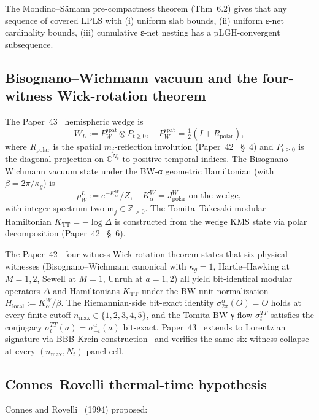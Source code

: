 \documentclass[11pt,a4paper]{article}
\theoremstyle{plain}
\theoremstyle{definition}
\newcommand{\nmax}{n_{\max}}
\newcommand{\Nt}{N_{t}}
\newcommand{\C}{\mathbb{C}}
\newcommand{\Z}{\mathbb{Z}}
\newcommand{\spat}{\mathrm{spat}}
\newcommand{\Kalpha}{K_{\alpha}^{W}}
\newcommand{\Hloc}{H_{\mathrm{local}}}
\newcommand{\kappag}{\kappa_{g}}
\begin{document}
The Mondino--S\"amann pre-compactness theorem (Thm~6.2) gives that
any sequence of covered LPLS with (i) uniform slab bounds, (ii) uniform
ε-net cardinality bounds, (iii) cumulative ε-net nesting has a
pLGH-convergent subsequence.

\subsection{Bisognano--Wichmann vacuum and the four-witness
Wick-rotation theorem}\label{sec:bw_four_witness_recap}

The Paper~43~\cite{paper43} hemispheric wedge is
\[
W_{L} := P_{W}^{\spat} \otimes P_{t \ge 0},
\quad
P_{W}^{\spat} = \tfrac{1}{2}(I + R_{\mathrm{polar}}),
\]
where $R_{\mathrm{polar}}$ is the spatial $m_{j}$-reflection involution
(Paper~42~\cite{paper42} \S~4) and $P_{t \ge 0}$ is the diagonal
projection on $\C^{\Nt}$ to positive temporal indices. The
Bisognano--Wichmann vacuum state under the BW-α geometric
Hamiltonian (with $\beta = 2\pi/\kappag$) is
\[
\rho_{W}^{L} := e^{-\Kalpha}/Z,
\quad
\Kalpha = J_{\mathrm{polar}}^{W} \text{ on the wedge},
\]
with integer spectrum $\mathrm{two\_m}_{j} \in \Z_{>0}$. The
Tomita--Takesaki modular Hamiltonian $K_{\mathrm{TT}} = -\log \Delta$
is constructed from the wedge KMS state via polar decomposition
(Paper~42~\cite{paper42} \S~6).

The Paper~42~\cite{paper42} four-witness Wick-rotation theorem states
that six physical witnesses (Bisognano--Wichmann canonical with
$\kappag = 1$, Hartle--Hawking at $M = 1, 2$, Sewell at $M = 1$, Unruh
at $a = 1, 2$) all yield bit-identical modular operators $\Delta$
and Hamiltonians $K_{\mathrm{TT}}$ under the BW unit normalization
$\Hloc := \Kalpha / \beta$. The Riemannian-side bit-exact identity
$\sigma_{2\pi}^{\alpha}(O) = O$ holds at every finite cutoff
$\nmax \in \{1, 2, 3, 4, 5\}$, and the Tomita BW-γ flow $\sigma_{t}^{TT}$
satisfies the conjugacy $\sigma_{t}^{TT}(a) = \sigma_{-t}^{\alpha}(a)$
bit-exact. Paper~43~\cite{paper43} extends to Lorentzian signature via
BBB Krein construction~\cite{bizi_brouder_besnard2018} and verifies
the same six-witness collapse at every $(\nmax, \Nt)$ panel cell.

\subsection{Connes--Rovelli thermal-time
hypothesis}\label{sec:connes_rovelli_recap}

Connes and Rovelli~\cite{connes_rovelli1994} (1994) proposed:
\end{document}
